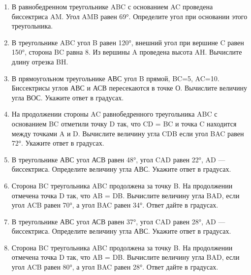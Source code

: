 \documentclass[a4paper,12pt]{article}
\newcommand{\taskspace}{\par\vspace{0.42cm}}
\begin{document}
\begin{enumerate}[resume]
\item В равнобедренном треугольнике ABC с основанием AC проведена биссектриса AM. Угол AMB равен 69°. Определите угол при основании этого треугольника.

\taskspace

\item В треугольнике ABC угол B равен 120°, внешний угол при вершине C равен 150°, сторона BC равна 8. Из вершины A проведена высота AH. Вычислите длину отрезка BH.

\taskspace

\item В прямоугольном треугольнике АВС угол B прямой, BC=5, AC=10. Биссектрисы углов АВС и АСВ пересекаются в точке О. Вычислите величину угла ВОС. Укажите ответ в градусах.

\taskspace

\item На продолжении стороны AC равнобедренного треугольника ABC с основанием BC отметили точку D так, что CD = BC и точка C находится между точками A и D. Вычислите величину угла CDB если угол BAC равен 72°. Укажите ответ в градусах.

\taskspace

\item В треугольнике АВС угол АСВ равен 48°, угол CAD равен 22°, AD --- биссектриса. Определите величину угла АВС. Укажите ответ в градусах.

\taskspace

\item Сторона BC треугольника ABC продолжена за точку B. На продолжении отмечена точка D так, что AB = DB. Вычислите величину угла BAD, если угол ACB равен 70°, а угол BAC равен 34°. Ответ дайте в градусах.

\taskspace

\item В треугольнике АВС угол АСВ равен 37°, угол CAD равен 28°, AD --- биссектриса. Определите величину угла АВС. Укажите ответ в градусах.

\taskspace

\item Сторона BC треугольника ABC продолжена за точку B. На продолжении отмечена точка D так, что AB = DB. Вычислите величину угла BAD, если угол ACB равен 80°, а угол BAC равен 28°. Ответ дайте в градусах.


\end{enumerate}
\end{document}
